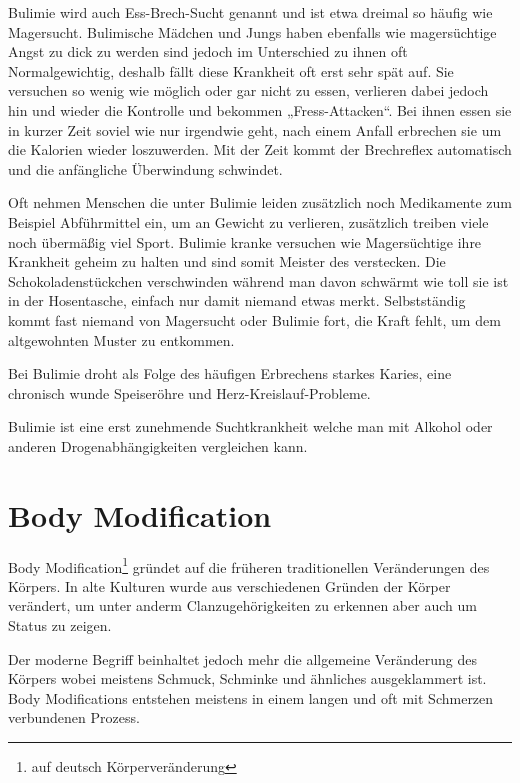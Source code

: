 Bulimie wird auch Ess-Brech-Sucht genannt und ist etwa dreimal so häufig wie Magersucht. Bulimische
Mädchen und Jungs haben ebenfalls wie magersüchtige Angst zu dick zu werden sind jedoch im
Unterschied zu ihnen oft Normalgewichtig, deshalb fällt diese Krankheit oft erst sehr spät auf. Sie
versuchen so wenig wie möglich oder gar nicht zu essen, verlieren dabei jedoch hin und wieder die
Kontrolle und bekommen „Fress-Attacken“. Bei ihnen essen sie in kurzer Zeit soviel wie nur irgendwie
geht, nach einem Anfall erbrechen sie um die Kalorien wieder loszuwerden. Mit der Zeit kommt der
Brechreflex automatisch und die anfängliche Überwindung schwindet.

Oft nehmen Menschen die unter Bulimie leiden zusätzlich noch Medikamente zum Beispiel Abführmittel
ein, um an Gewicht zu verlieren, zusätzlich treiben viele noch übermäßig viel Sport. Bulimie kranke
versuchen wie Magersüchtige ihre Krankheit geheim zu halten und sind somit Meister des verstecken.
Die Schokoladenstückchen verschwinden während man davon schwärmt wie toll sie ist in der Hosentasche,
einfach nur damit niemand etwas merkt. Selbstständig kommt fast niemand von Magersucht oder Bulimie
fort, die Kraft fehlt, um dem altgewohnten Muster zu entkommen.

Bei Bulimie droht als Folge des häufigen Erbrechens starkes Karies, eine chronisch wunde Speiseröhre
und Herz-Kreislauf-Probleme.

Bulimie ist eine erst zunehmende Suchtkrankheit welche man mit Alkohol oder anderen
Drogenabhängigkeiten vergleichen kann.

\begin{figurewrapper}
	 \hfill
	\caption{???}
\end{figurewrapper}


\section{Body Modification}
Body Modification\footnote{auf deutsch Körperveränderung} gründet auf die früheren traditionellen
Veränderungen des Körpers. In alte Kulturen wurde aus verschiedenen Gründen der Körper verändert, um
unter anderm Clanzugehörigkeiten zu erkennen aber auch um Status zu zeigen.

Der moderne Begriff beinhaltet jedoch mehr die allgemeine Veränderung des Körpers wobei meistens
Schmuck, Schminke und ähnliches ausgeklammert ist. Body Modifications entstehen meistens in einem
langen und oft mit Schmerzen verbundenen Prozess.


